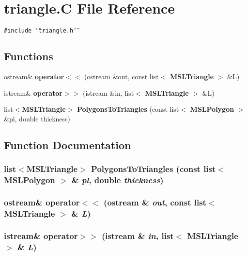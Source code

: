 \section{triangle.C File Reference}
\label{triangle_C}
{\tt \#include \char`\"{}triangle.h\char`\"{}}\par
\subsection*{Functions}
\begin{CompactItemize}
\item 
ostream\& {\bf operator$<$$<$} (ostream \&out, const list$<$ {\bf MSLTriangle} $>$ \&L)
\item 
istream\& {\bf operator$>$$>$} (istream \&in, list$<$ {\bf MSLTriangle} $>$ \&L)
\item 
list$<${\bf MSLTriangle}$>$ {\bf Polygons\-To\-Triangles} (const list$<$ {\bf MSLPolygon} $>$ \&pl, double thickness)
\end{CompactItemize}


\subsection{Function Documentation}
\subsubsection{\setlength{\rightskip}{0pt plus 5cm}list$<${\bf MSLTriangle}$>$ Polygons\-To\-Triangles (const list$<$ {\bf MSLPolygon} $>$ \& {\em pl}, double {\em thickness})}\label{triangle_C_a2}


\subsubsection{\setlength{\rightskip}{0pt plus 5cm}ostream\& operator$<$$<$ (ostream \& {\em out}, const list$<$ {\bf MSLTriangle} $>$ \& {\em L})}\label{triangle_C_a0}


\subsubsection{\setlength{\rightskip}{0pt plus 5cm}istream\& operator$>$$>$ (istream \& {\em in}, list$<$ {\bf MSLTriangle} $>$ \& {\em L})}\label{triangle_C_a1}


